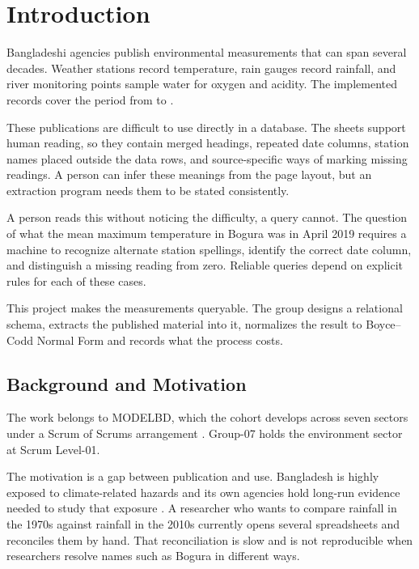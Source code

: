 \section{Introduction}
\label{sec:introduction}

Bangladeshi agencies publish environmental measurements that can span several
decades. Weather stations record temperature, rain gauges record rainfall, and
river monitoring points sample water for oxygen and acidity. The implemented
records cover the period from \mYearMin{} to \mYearMax.

These publications are difficult to use directly in a database. The sheets
support human reading, so they contain merged headings, repeated date columns,
station names placed outside the data rows, and source-specific ways of marking
missing readings. A person can infer these meanings from the page layout, but
an extraction program needs them to be stated consistently.

A person reads this without noticing the difficulty, a query cannot. The
question of what the mean maximum temperature in Bogura was in April 2019
requires a machine to recognize alternate station spellings, identify the
correct date column, and distinguish a missing reading from zero. Reliable
queries depend on explicit rules for each of these cases.

This project makes the measurements queryable. The group designs a relational
schema, extracts the published material into it, normalizes the result to
Boyce--Codd Normal Form and records what the process costs.

\subsection{Background and Motivation}
\label{subsec:bm}

The work belongs to MODELBD, which the cohort develops across seven sectors
under a Scrum of Scrums arrangement \cite{scrumguide2020}. Group-07 holds the
environment sector at Scrum Level-01.

The motivation is a gap between publication and use. Bangladesh is highly
exposed to climate-related hazards and its own agencies hold long-run evidence
needed to study that exposure \cite{worldbank_climate_bd}. A researcher who
wants to compare rainfall in the 1970s against rainfall in the 2010s currently
opens several spreadsheets and reconciles them by hand. That reconciliation is
slow and is not reproducible when researchers resolve names such as Bogura in
different ways.

